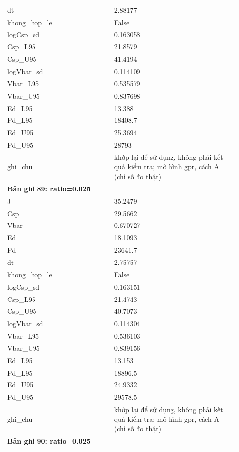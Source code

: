 \begin{longtable}{p{0.43\linewidth}p{0.50\linewidth}}
dt & 2.88177 \\
khong\_\allowbreak hop\_\allowbreak le & False \\
logCsp\_\allowbreak sd & 0.163058 \\
Csp\_\allowbreak L95 & 21.8579 \\
Csp\_\allowbreak U95 & 41.4194 \\
logVbar\_\allowbreak sd & 0.114109 \\
Vbar\_\allowbreak L95 & 0.535579 \\
Vbar\_\allowbreak U95 & 0.837698 \\
Ed\_\allowbreak L95 & 13.388 \\
Pd\_\allowbreak L95 & 18408.7 \\
Ed\_\allowbreak U95 & 25.3694 \\
Pd\_\allowbreak U95 & 28793 \\
ghi\_\allowbreak chu & khớp lại để sử dụng, không phải kết quả kiểm tra; mô hình gpr, cách A (chỉ số đo thật) \\
\midrule
\multicolumn{2}{p{0.95\linewidth}}{\textbf{Bản ghi 89: ratio=0.025}} \\
J & 35.2479 \\
Csp & 29.5662 \\
Vbar & 0.670727 \\
Ed & 18.1093 \\
Pd & 23641.7 \\
dt & 2.75757 \\
khong\_\allowbreak hop\_\allowbreak le & False \\
logCsp\_\allowbreak sd & 0.163151 \\
Csp\_\allowbreak L95 & 21.4743 \\
Csp\_\allowbreak U95 & 40.7073 \\
logVbar\_\allowbreak sd & 0.114304 \\
Vbar\_\allowbreak L95 & 0.536103 \\
Vbar\_\allowbreak U95 & 0.839156 \\
Ed\_\allowbreak L95 & 13.153 \\
Pd\_\allowbreak L95 & 18896.5 \\
Ed\_\allowbreak U95 & 24.9332 \\
Pd\_\allowbreak U95 & 29578.5 \\
ghi\_\allowbreak chu & khớp lại để sử dụng, không phải kết quả kiểm tra; mô hình gpr, cách A (chỉ số đo thật) \\
\midrule
\multicolumn{2}{p{0.95\linewidth}}{\textbf{Bản ghi 90: ratio=0.025}} \\

\end{longtable}
